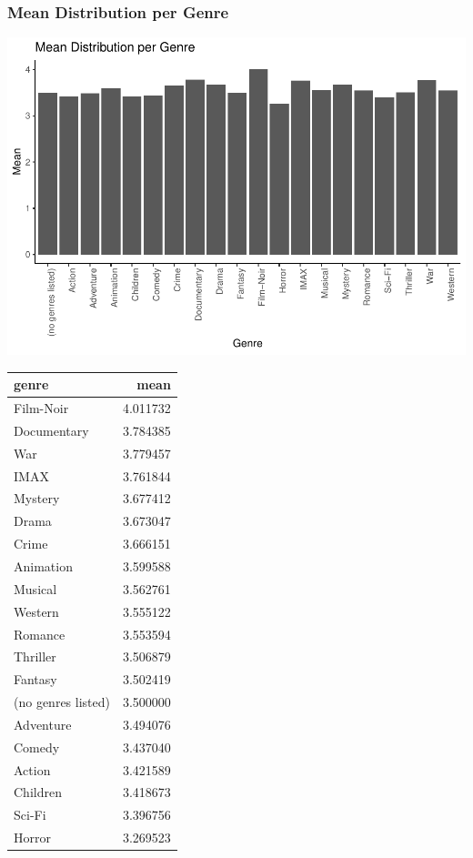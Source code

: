 \documentclass[
]{article}
\begin{document}
\hypertarget{mean-distribution-per-genre}{%
\subsubsection{Mean Distribution per
Genre}\label{mean-distribution-per-genre}}

\begin{center}\includegraphics{MovieLens-Project-Report_files/figure-latex/unnamed-chunk-28-1} \end{center}

\begin{table}
\centering\begingroup\fontsize{10}{12}\selectfont

\begin{tabular}{l|r}
\hline
genre & mean\\
\hline
Film-Noir & 4.011732\\
\hline
Documentary & 3.784385\\
\hline
War & 3.779457\\
\hline
IMAX & 3.761844\\
\hline
Mystery & 3.677412\\
\hline
Drama & 3.673047\\
\hline
Crime & 3.666151\\
\hline
Animation & 3.599588\\
\hline
Musical & 3.562761\\
\hline
Western & 3.555122\\
\hline
Romance & 3.553594\\
\hline
Thriller & 3.506879\\
\hline
Fantasy & 3.502419\\
\hline
(no genres listed) & 3.500000\\
\hline
Adventure & 3.494076\\
\hline
Comedy & 3.437040\\
\hline
Action & 3.421589\\
\hline
Children & 3.418673\\
\hline
Sci-Fi & 3.396756\\
\hline
Horror & 3.269523\\
\hline
\end{tabular}
\endgroup{}
\end{table}
\end{document}
